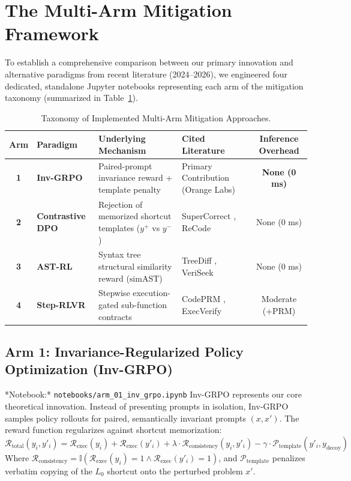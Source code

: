 \documentclass[12pt, a4paper]{article}
\begin{document}
\section{The Multi-Arm Mitigation Framework}

To establish a comprehensive comparison between our primary innovation and alternative paradigms from recent literature (2024--2026), we engineered four dedicated, standalone Jupyter notebooks representing each arm of the mitigation taxonomy (summarized in Table~\ref{tab:mitigation_arms}).

\begin{table}[H]
\centering
\small
\caption{Taxonomy of Implemented Multi-Arm Mitigation Approaches.}
\label{tab:mitigation_arms}
\begin{tabularx}{\textwidth}{c l p{4.2cm} p{3.8cm} c}
\toprule
\textbf{Arm} & \textbf{Paradigm} & \textbf{Underlying Mechanism} & \textbf{Cited Literature} & \textbf{Inference Overhead} \\
\midrule
\textbf{1} & \textbf{Inv-GRPO} & Paired-prompt invariance reward + template penalty & Primary Contribution (Orange Labs) & \textbf{None (0 ms)} \\
\textbf{2} & \textbf{Contrastive DPO} & Rejection of memorized shortcut templates ($y^+$ vs $y^-$) & SuperCorrect \cite{supercorrect}, ReCode \cite{recode_contrastive} & None (0 ms) \\
\textbf{3} & \textbf{AST-RL} & Syntax tree structural similarity reward ($\text{simAST}$) & TreeDiff \cite{treediff}, VeriSeek \cite{veriseek} & None (0 ms) \\
\textbf{4} & \textbf{Step-RLVR} & Stepwise execution-gated sub-function contracts & CodePRM \cite{codeprm}, ExecVerify \cite{execverify} & Moderate (+PRM) \\
\bottomrule
\end{tabularx}
\end{table}

\subsection{Arm 1: Invariance-Regularized Policy Optimization (Inv-GRPO)}
*Notebook:* \texttt{notebooks/arm\_01\_inv\_grpo.ipynb}  
Inv-GRPO represents our core theoretical innovation. Instead of presenting prompts in isolation, Inv-GRPO samples policy rollouts for paired, semantically invariant prompts $(x, x')$. The reward function regularizes against shortcut memorization:
\begin{equation}
\mathcal{R}_{\text{total}}(y_i, y'_i) = \mathcal{R}_{\text{exec}}(y_i) + \mathcal{R}_{\text{exec}}(y'_i) + \lambda \cdot \mathcal{R}_{\text{consistency}}(y_i, y'_i) - \gamma \cdot \mathcal{P}_{\text{template}}(y'_i, y_{\text{decoy}})
\end{equation}
Where $\mathcal{R}_{\text{consistency}} = \mathbb{I}(\mathcal{R}_{\text{exec}}(y_i)=1 \land \mathcal{R}_{\text{exec}}(y'_i)=1)$, and $\mathcal{P}_{\text{template}}$ penalizes verbatim copying of the $L_0$ shortcut onto the perturbed problem $x'$.
\end{document}
